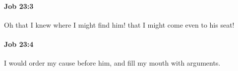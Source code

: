 		\paragraph{Job 23:3} %
			\label{JOB-23-3}

			Oh that I knew where I might find him! that I might come even to his seat!


		\paragraph{Job 23:4} %
			\label{JOB-23-4}

			I would order my cause before him, and fill my mouth with arguments.


